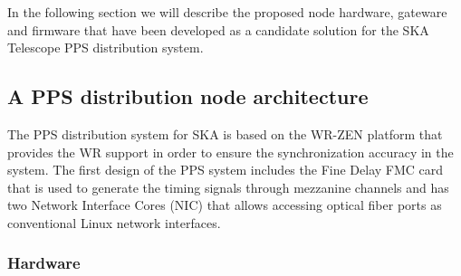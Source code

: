 In the following section we will describe the proposed node hardware, gateware and firmware that have been developed as a candidate solution for the SKA Telescope PPS distribution system. 

\subsection{A PPS distribution node architecture}


The PPS distribution system for SKA is based on the WR-ZEN platform that provides the WR support in order to ensure the synchronization accuracy in the system. The first design of the PPS system includes the Fine Delay FMC card that is used to generate the timing signals through mezzanine channels and has two Network Interface Cores (NIC) that allows accessing optical fiber ports as conventional Linux network interfaces.

\subsubsection{Hardware}
\label{subsec:hardware}

%
%

